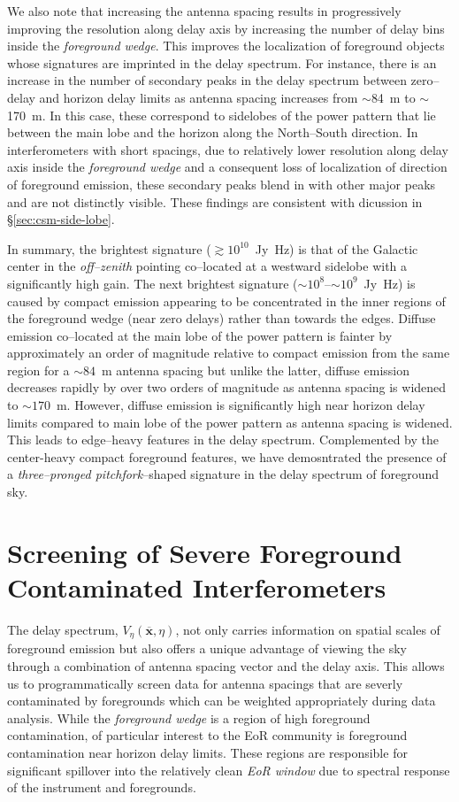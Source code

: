 \documentclass[preprint2,iop,numberedappendix]{emulateapj}
\begin{document}
We also note that increasing the antenna spacing results in progressively improving the resolution along delay axis by increasing the number of delay bins inside the {\it foreground wedge}. This improves the localization of foreground objects whose signatures are imprinted in the delay spectrum. For instance, there is an increase in the number of secondary peaks in the delay spectrum between zero--delay and horizon delay limits as antenna spacing increases from $\sim$84~m to $\sim$170~m. In this case, these correspond to sidelobes of the power pattern that lie between the main lobe and the horizon along the North--South direction. In interferometers with short spacings, due to relatively lower resolution along delay axis inside the {\it foreground wedge} and a consequent loss of localization of direction of foreground emission, these secondary peaks blend in with other major peaks and are not distinctly visible. These findings are consistent with dicussion in \S\ref{sec:csm-side-lobe}.

In summary, the brightest signature ($\gtrsim 10^{10}$~Jy~Hz) is that of the Galactic center in the {\it off--zenith} pointing co--located at a westward sidelobe with a significantly high gain. The next brightest signature ($\sim 10^8$--$\sim 10^9$~Jy~Hz) is caused by compact emission appearing to be concentrated in the inner regions of the foreground wedge (near zero delays) rather than towards the edges. Diffuse emission co--located at the main lobe of the power pattern is fainter by approximately an order of magnitude relative to compact emission from the same region for a $\sim 84$~m antenna spacing but unlike the latter, diffuse emission decreases rapidly by over two orders of magnitude as antenna spacing is widened to $\sim 170$~m. However, diffuse emission is significantly high near horizon delay limits compared to main lobe of the power pattern as antenna spacing is widened. This leads to edge--heavy features in the delay spectrum. Complemented by the center-heavy compact foreground features, we have demosntrated the presence of a {\it three--pronged pitchfork}--shaped signature in the delay spectrum of foreground sky.

\section{Screening of Severe Foreground Contaminated Interferometers}\label{sec:fg-grading}

The delay spectrum, $V_\eta(\overline{\mathbf{x}},\eta)$, not only carries information on spatial scales of foreground emission but also offers a unique advantage of viewing the sky through a combination of antenna spacing vector and the delay axis. This allows us to programmatically screen data for antenna spacings that are severly contaminated by foregrounds which can be weighted appropriately during data analysis. While the {\it foreground wedge} is a region of high foreground contamination, of particular interest to the EoR community is foreground contamination near horizon delay limits. These regions are responsible for significant spillover into the relatively clean {\it EoR window} due to spectral response of the instrument and foregrounds. 
\end{document}
